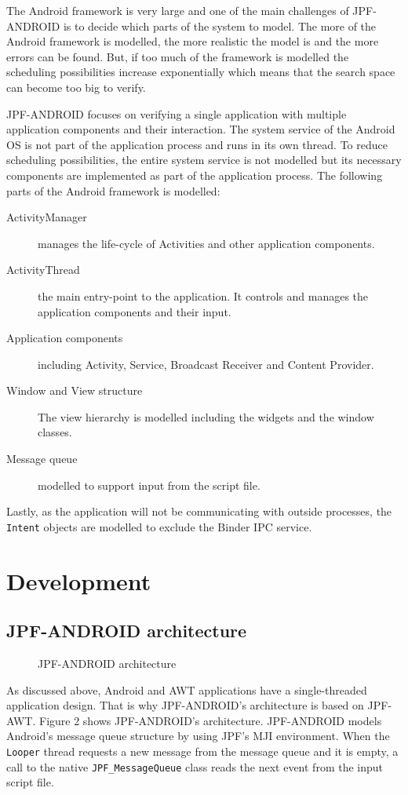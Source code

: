 \documentclass{acm_proc_article-sp}
\begin{document}
The Android framework is very large and one of the main challenges of JPF-ANDROID is to decide which parts of the system to model. The more
of the Android framework is modelled, the more realistic the model is and the more errors can be found. But, if too much
of the framework is modelled the scheduling possibilities increase exponentially which means that the search space can become too big to
verify.

JPF-ANDROID focuses on verifying a single application with multiple application components and their interaction. The system service of
the Android OS is not part of the application process and runs in its own thread. To reduce scheduling possibilities, the entire system
service is not modelled but its necessary components are implemented as part of the application process. The following parts of the Android
framework is modelled:
\begin{description}
 \item [ActivityManager]  manages the life-cycle of Activities and other application components.
 \item [ActivityThread]   the main entry-point to the application. It controls and manages the application components and their input.
 \item [Application components] including Activity, Service, Broadcast Receiver and Content Provider. 
 \item [Window and View structure] The view hierarchy is modelled including the widgets and the window classes.
 \item [Message queue] modelled to support input from the script file.
\end{description}

Lastly, as the application will not be communicating with outside processes, the \texttt{Intent} objects are modelled to exclude the
Binder IPC service.

\section{Development}
\subsection{JPF-ANDROID architecture}
\begin{figure}
\centering
{}
\caption{JPF-ANDROID architecture}
\end{figure}
As discussed above, Android and AWT applications have a single-threaded application design. That is why JPF-ANDROID's architecture
is based on JPF-AWT. Figure 2 shows JPF-ANDROID's architecture. JPF-ANDROID models Android's message queue structure
by using JPF's MJI environment. When the \texttt{Looper} thread requests a new message from the message queue and it is empty, a call to the
native \texttt{JPF\_MessageQueue} class reads the next event from the input script file.
\end{document}
